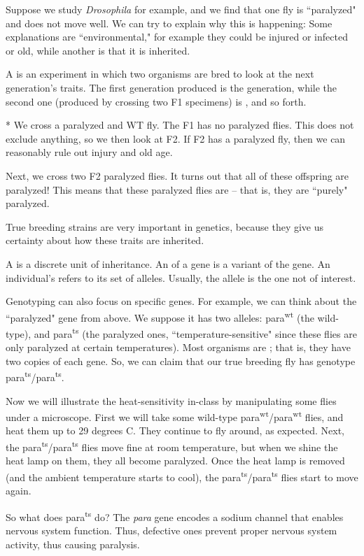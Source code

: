 Suppose we study \emph{Drosophila} for example, and we find that one fly is ``paralyzed" and does not move well. We can try to explain why this is happening: Some explanations are ``environmental," for example they could be injured or infected or old, while another is that it is inherited.

\begin{defn}
	A  is an experiment in which two organisms are bred to look at the next generation's traits. The first generation produced is the  generation, while the second one (produced by crossing two F1 specimens) is , and so forth. 
\end{defn}

\begin{exper}*
	We cross a paralyzed and WT fly. The F1 has no paralyzed flies. This does not exclude anything, so we then look at F2. If F2 has a paralyzed fly, then we can reasonably rule out injury and old age. 

	Next, we cross two F2 paralyzed flies. It turns out that all of these offspring are paralyzed! This means that these paralyzed flies are  -- that is, they are ``purely" paralyzed. 
\end{exper}

True breeding strains are very important in genetics, because they give us certainty about how these traits are inherited. 

\begin{defn}
	A  is a discrete unit of inheritance. An  of a gene is a variant of the gene. An individual's  refers to its set of alleles. Usually, the  allele is the one not of interest.
\end{defn}

Genotyping can also focus on specific genes. For example, we can think about the ``paralyzed" gene from above. We suppose it has two alleles: para\textsuperscript{wt} (the wild-type), and para\textsuperscript{ts} (the paralyzed ones, ``temperature-sensitive" since these flies are only paralyzed at certain temperatures). Most organisms are ; that is, they have two copies of each gene. So, we can claim that our true breeding fly has genotype para\textsuperscript{ts}/para\textsuperscript{ts}. 

\begin{exper}
	Now we will illustrate the heat-sensitivity in-class by manipulating some flies under a microscope. First we will take some wild-type para\textsuperscript{wt}/para\textsuperscript{wt} flies, and heat them up to 29 degrees C. They continue to fly around, as expected. Next, the para\textsuperscript{ts}/para\textsuperscript{ts} flies move fine at room temperature, but when we shine the heat lamp on them, they all become paralyzed. Once the heat lamp is removed (and the ambient temperature starts to cool), the para\textsuperscript{ts}/para\textsuperscript{ts} flies start to move again.
\end{exper}

So what does para\textsuperscript{ts} do? The \emph{para} gene encodes a sodium channel that enables nervous system function. Thus, defective ones prevent proper nervous system activity, thus causing paralysis.
